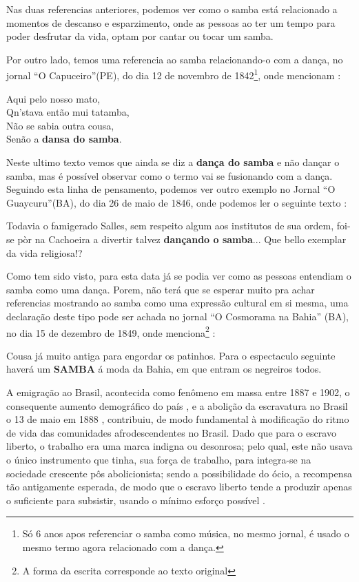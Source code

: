 Nas duas referencias anteriores, 
podemos ver como o samba está relacionado a momentos de descanso e esparzimento, 
onde as pessoas ao ter um tempo para poder desfrutar da vida,
optam por cantar ou tocar um samba.

Por outro lado, temos uma referencia ao samba relacionando-o com a dança, no jornal ``O Capuceiro''(PE),
do dia 12 de novembro de 1842\footnote{Só 6 anos apos referenciar o samba como música, 
no mesmo jornal, é usado o mesmo termo agora relacionado com a dança.}, 
onde mencionam \cite[pp. 5]{sambaperiodicoocapuceiro2}:
\begin{citando}%
Aqui pelo nosso mato,\\
Qn'stava então mui tatamba,\\
Não se sabia outra cousa,\\
Senão a \textbf{dansa do samba}.
\end{citando}
Neste ultimo texto vemos que ainda se diz a \textbf{dança do samba} e não dançar o samba,
mas é possível observar como o termo vai se fusionando com a dança.
Seguindo esta linha de pensamento, 
podemos ver outro exemplo no Jornal ``O Guaycuru''(BA), do dia 26 de maio de 1846,
onde podemos ler o seguinte texto \cite[pp. 2]{sambaperiodicooguaycuru}:
\begin{citando}%
Todavia o famigerado Salles, sem respeito algum aos institutos de sua ordem, 
foi-se pòr na Cachoeira a divertir talvez \textbf{dançando o samba}...
Que bello exemplar da vida religiosa!?
\end{citando}
Como tem sido visto, 
para esta data já se podia ver como as pessoas entendiam o samba como uma dança.
Porem, não terá que se esperar muito pra achar referencias mostrando ao samba
como uma expressão cultural em si mesma, 
uma declaração deste tipo pode ser achada no jornal ``O Cosmorama na Bahia'' (BA), 
no dia 15 de dezembro de 1849, onde menciona\footnote{\label{footort3}A forma da escrita corresponde ao texto original} \cite[pp. 2]{sambaperiodicoocosmorama}:
\begin{citando}%
Cousa já muito antiga para engordar os patinhos. 
Para o espectaculo seguinte haverá um \textbf{SAMBA} á moda da Bahia, 
em que entram os negreiros todos.
\end{citando}



A emigração ao Brasil, acontecida como fenômeno em massa   entre 1887 e 1902,
o consequente aumento demográfico do país \cite[pp. 18]{trento1989outro}, e 
a abolição da escravatura no Brasil o 13 de maio em 1888 \cite[pp. 117]{dorigny2019abolicoes},
contribuiu, de modo fundamental à modificação do ritmo de vida das comunidades
afrodescendentes no Brasil.
Dado que para o escravo liberto, o trabalho era uma marca indigna ou desonrosa;
pelo qual, este não usava  o único instrumento que tinha, sua força de trabalho, 
para  integra-se na sociedade crescente pôs abolicionista; 
sendo a possibilidade do ócio, a recompensa tão antigamente esperada, 
de modo que o escravo liberto tende a produzir apenas o suficiente para subsistir,
usando o mínimo esforço possível \cite[pp. 28]{durham1966assimilacao} \cite[pp. 25]{trento1989outro}.

